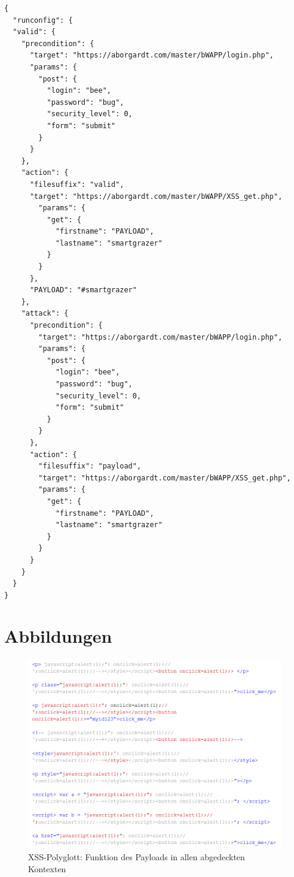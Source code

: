 \begin{lstlisting}[caption={Vollständiges Beispiel einer SUT-Konfigurationsdatei},label=lst:full-sut-config]
{
  "runconfig": {
  "valid": {
    "precondition": {
      "target": "https://aborgardt.com/master/bWAPP/login.php",
      "params": {
        "post": {
          "login": "bee",
          "password": "bug",
          "security_level": 0,
          "form": "submit"
        }
      }
    },
    "action": {
      "filesuffix": "valid",
      "target": "https://aborgardt.com/master/bWAPP/XSS_get.php",
        "params": {
          "get": {
            "firstname": "PAYLOAD",
            "lastname": "smartgrazer"
          }
        }
      },
      "PAYLOAD": "#smartgrazer"
    },
    "attack": {
      "precondition": {
        "target": "https://aborgardt.com/master/bWAPP/login.php",
        "params": {
          "post": {
            "login": "bee",
            "password": "bug",
            "security_level": 0,
            "form": "submit"
          }
        }
      },
      "action": {
        "filesuffix": "payload",
        "target": "https://aborgardt.com/master/bWAPP/XSS_get.php",
        "params": {
          "get": {
            "firstname": "PAYLOAD",
            "lastname": "smartgrazer"
          }
        }
      }
    }
  }
}
\end{lstlisting}

\newpage
\chapter{Abbildungen}

\begin{figure}[htbp] 
	\centering
	\includegraphics[width=\textwidth]{contents/images/PolyglottFullExample}
	\caption{XSS-Polyglott: Funktion des Payloads in allen abgedeckten Kontexten}
	\label{fig:PolyglottFullExample}
\end{figure}

